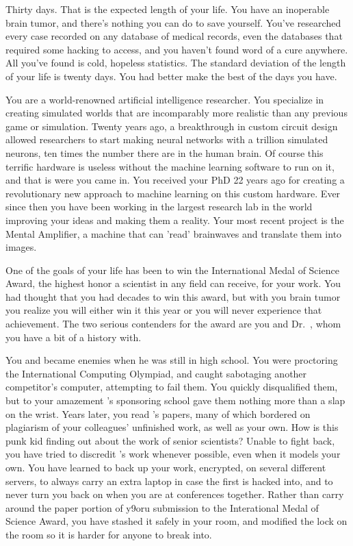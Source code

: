\documentclass[char]{guildcamp1}
\begin{document}
\name{\cScientist{}}

Thirty days.  That is the expected length of your life.  You have an inoperable brain tumor, and there's nothing you can do to save yourself.  You've researched every case recorded on any database of medical records, even the databases that required some hacking to access, and you haven't found word of a cure anywhere.  All you've found is cold, hopeless statistics.  The standard deviation of the length of your life is twenty days.  You had better make the best of the days you have.

You are a world-renowned artificial intelligence researcher. You specialize in creating simulated worlds that are incomparably more realistic than any previous game or simulation.  Twenty years ago, a breakthrough in custom circuit design allowed researchers to start making neural networks with a trillion simulated neurons, ten times the number there are in the human brain.  Of course this terrific hardware is useless without the machine learning software to run on it, and that is were you came in.  You received your PhD  22 years ago for creating a revolutionary new approach to machine learning on this custom hardware.  Ever since then you have been working in the largest research lab in the world improving your ideas and making them a reality. Your most recent project is the Mental Amplifier, a machine that can 'read' brainwaves and translate them into images.

One of the goals of your life has been to win the International Medal of Science Award, the highest honor a scientist in any field can receive, for your work.  You had thought that you had decades to win this award, but with you brain tumor you realize you will either win it this year or you will never experience that achievement.  The two serious contenders for the award are you and Dr.~\cRival{\intro{}}, whom you have a bit of a history with.  

You and \cRival{} became enemies when he was still in high school.  You were proctoring the International Computing Olympiad, and caught \cRival{} sabotaging another competitor's computer, attempting to fail them. You quickly disqualified them, but to your amazement \cRival{}'s sponsoring school gave them nothing more than a slap on the wrist. Years later, you read \cRival{}'s papers, many of which bordered on plagiarism of your colleagues' unfinished work, as well as your own. How is this punk kid finding out about the work of senior scientists? Unable to fight back, you have tried to discredit \cRival{}'s work whenever possible, even when it models your own. You have learned to back up your work, encrypted, on several different servers, to always carry an extra laptop in case the first is hacked into, and to never turn you back on \cRival{} when you are at conferences together. Rather than carry around the paper portion of y9oru submission to the Interational Medal of Science Award, you have stashed it safely in your room, and modified the lock on the room so it is harder for anyone to break into.
\end{document}
